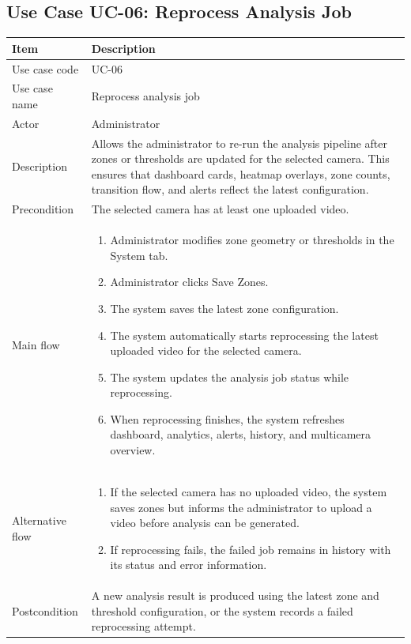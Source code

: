 \documentclass[12pt,a4paper]{report}
\begin{document}
\subsection{Use Case UC-06: Reprocess Analysis Job}
\begin{longtable}{|p{3.6cm}|p{10.4cm}|}
\hline
\rowcolor{HeaderBlue}\textbf{Item} & \textbf{Description} \\
\hline
Use case code & UC-06 \\
\hline
Use case name & Reprocess analysis job \\
\hline
Actor & Administrator \\
\hline
Description & Allows the administrator to re-run the analysis pipeline after zones or thresholds are updated for the selected camera. This ensures that dashboard cards, heatmap overlays, zone counts, transition flow, and alerts reflect the latest configuration. \\
\hline
Precondition & The selected camera has at least one uploaded video. \\
\hline
Main flow &
\begin{enumerate}
    \item Administrator modifies zone geometry or thresholds in the System tab.
    \item Administrator clicks Save Zones.
    \item The system saves the latest zone configuration.
    \item The system automatically starts reprocessing the latest uploaded video for the selected camera.
    \item The system updates the analysis job status while reprocessing.
    \item When reprocessing finishes, the system refreshes dashboard, analytics, alerts, history, and multicamera overview.
\end{enumerate} \\
\hline
Alternative flow &
\begin{enumerate}
    \item If the selected camera has no uploaded video, the system saves zones but informs the administrator to upload a video before analysis can be generated.
    \item If reprocessing fails, the failed job remains in history with its status and error information.
\end{enumerate} \\
\hline
Postcondition & A new analysis result is produced using the latest zone and threshold configuration, or the system records a failed reprocessing attempt. \\
\hline
\end{longtable}
\end{document}
